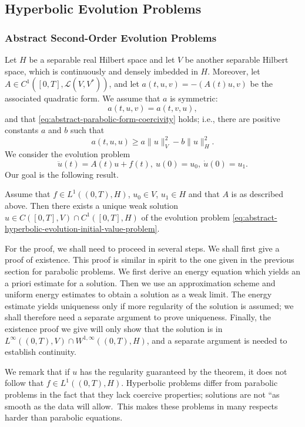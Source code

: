 \subsection{Hyperbolic Evolution Problems}\label{sec:hyperbolic-evolution-problems}

\subsubsection{Abstract Second-Order Evolution Problems}\label{subsec:abstract-second-order-evolution-problems}

Let $H$ be a separable real Hilbert space and let $V$ be another separable Hilbert space, which is continuously and densely imbedded in $H$. Moreover, let $A\in C^1([0,T],\mathcal{L}(V,V^*))$, and let $a(t,u,v)=-(A(t)u,v)$ be the associated quadratic form. We assume that $a$ is symmetric:
\begin{equation}\label{eq:abstract-hyperbolic-form-symmetry}
a(t,u,v)=a(t,v,u),
\end{equation}
and that \eqref{eq:abstract-parabolic-form-coercivity} holds; i.e., there are positive constants $a$ and $b$ such that
\begin{equation}\label{eq:abstract-hyperbolic-form-coercivity}
a(t,u,u)\geq a\|u\|_V^2-b\|u\|_H^2.
\end{equation}
We consider the evolution problem
\begin{equation}\label{eq:abstract-hyperbolic-evolution-initial-value-problem}
\ddot u(t)=A(t)u+f(t),\ u(0)=u_0,\ \dot u(0)=u_1.
\end{equation}
Our goal is the following result.

\begin{Theorem}
\label{thm:abstract-hyperbolic-existence-uniqueness}
Assume that $f\in L^1((0,T),H)$, $u_0\in V$, $u_1\in H$ and that $A$ is as described above. Then there exists a unique weak solution $u\in C([0,T],V)\cap C^1([0,T],H)$ of the evolution problem \eqref{eq:abstract-hyperbolic-evolution-initial-value-problem}.
\end{Theorem}

For the proof, we shall need to proceed in several steps. We shall first give a proof of existence. This proof is similar in spirit to the one given in the previous section for parabolic problems. We first derive an energy equation which yields an a priori estimate for a solution. Then we use an approximation scheme and uniform energy estimates to obtain a solution as a weak limit. The energy estimate yields uniqueness only if more regularity of the solution is assumed; we shall therefore need a separate argument to prove uniqueness. Finally, the existence proof we give will only show that the solution is in $L^\infty((0,T),V)\cap W^{1,\infty}((0,T),H)$, and a separate argument is needed to establish continuity.\par We remark that if $u$ has the regularity guaranteed by the theorem, it does not follow that $f\in L^1((0,T),H)$. Hyperbolic problems differ from parabolic problems in the fact that they lack coercive properties; solutions are not ``as smooth as the data will allow.\textquotesingle\textquotesingle\ This makes these problems in many respects harder than parabolic equations.

